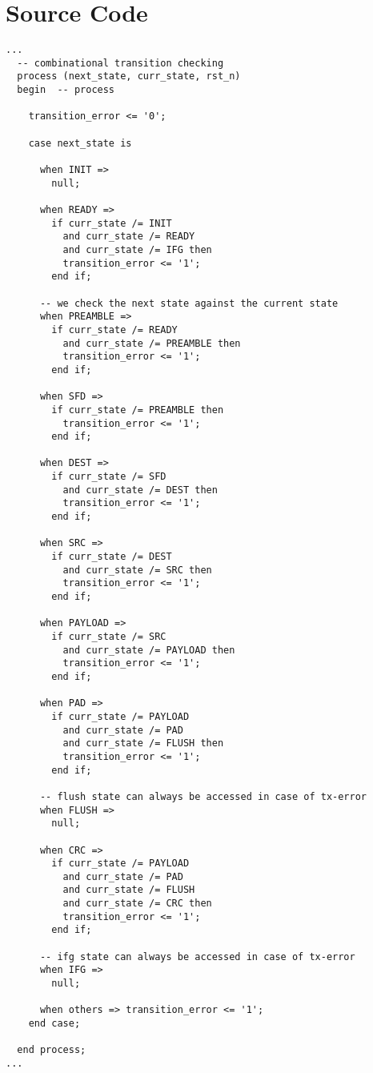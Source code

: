 \chapter{Source Code}
\label{chap:sourcecode}

\begin{center}
\lstset{language=VHDL}
\begin{lstlisting}[caption={Combinational part of the checker for state transition inspection},label={lst:appendix_trans_checker}]
...
  -- combinational transition checking
  process (next_state, curr_state, rst_n)
  begin  -- process

    transition_error <= '0';

    case next_state is

      when INIT =>
        null;
        
      when READY =>
        if curr_state /= INIT
          and curr_state /= READY
          and curr_state /= IFG then
          transition_error <= '1';
        end if;

      -- we check the next state against the current state
      when PREAMBLE =>
        if curr_state /= READY
          and curr_state /= PREAMBLE then
          transition_error <= '1';
        end if;

      when SFD =>
        if curr_state /= PREAMBLE then
          transition_error <= '1';
        end if;

      when DEST =>
        if curr_state /= SFD
          and curr_state /= DEST then
          transition_error <= '1';
        end if;

      when SRC =>
        if curr_state /= DEST
          and curr_state /= SRC then
          transition_error <= '1';
        end if;

      when PAYLOAD =>
        if curr_state /= SRC
          and curr_state /= PAYLOAD then
          transition_error <= '1';
        end if;

      when PAD =>
        if curr_state /= PAYLOAD
          and curr_state /= PAD
          and curr_state /= FLUSH then
          transition_error <= '1';
        end if;

      -- flush state can always be accessed in case of tx-error
      when FLUSH =>
        null;

      when CRC =>
        if curr_state /= PAYLOAD
          and curr_state /= PAD
          and curr_state /= FLUSH
          and curr_state /= CRC then
          transition_error <= '1';
        end if;

      -- ifg state can always be accessed in case of tx-error
      when IFG =>
        null;
        
      when others => transition_error <= '1';
    end case;
    
  end process;
...
\end{lstlisting}
\end{center}
